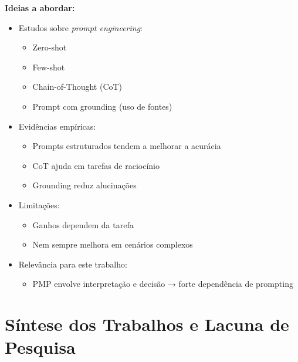 \textbf{Ideias a abordar:}
\begin{itemize}
    \item Estudos sobre \textit{prompt engineering}:
    \begin{itemize}
        \item Zero-shot
        \item Few-shot
        \item Chain-of-Thought (CoT)
        \item Prompt com grounding (uso de fontes)
    \end{itemize}
    \item Evidências empíricas:
    \begin{itemize}
        \item Prompts estruturados tendem a melhorar a acurácia
        \item CoT ajuda em tarefas de raciocínio
        \item Grounding reduz alucinações
    \end{itemize}
    \item Limitações:
    \begin{itemize}
        \item Ganhos dependem da tarefa
        \item Nem sempre melhora em cenários complexos
    \end{itemize}
    \item Relevância para este trabalho:
    \begin{itemize}
        \item PMP envolve interpretação e decisão → forte dependência de prompting
    \end{itemize}
\end{itemize}


\section{Síntese dos Trabalhos e Lacuna de Pesquisa}
\label{subsec:sintese_gap}


